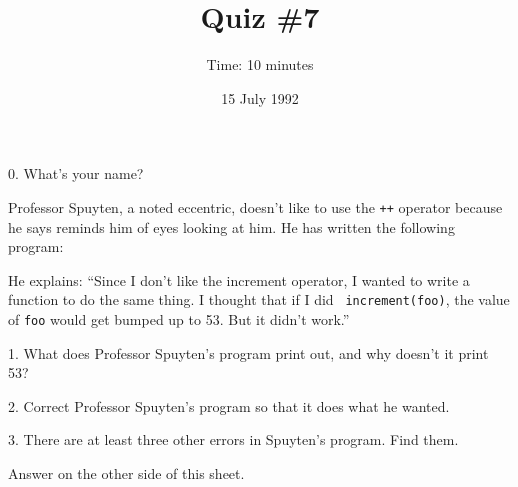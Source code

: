 



\topmargin -0.5in
\textheight 9in

\title{Quiz \#7}
\date{15 July 1992}
\author{Time: 10 minutes}


\maketitle

0. What's your name?

\vspace{.5in}

Professor Spuyten, a noted eccentric, doesn't like to use the {\tt ++}
operator because he says reminds him of eyes looking at him.  He has
written the following program:


\vspace{8pt}

He explains: ``Since I don't like the increment operator, I wanted to
write a function to do the same thing.  I thought that if I did {\tt
increment(foo)}, the value of {\tt foo} would get bumped up to 53.  But
it didn't work.''

\vspace{8pt}
1.  What does Professor Spuyten's program print out, and why doesn't it
print 53?

\vspace{16pt}

2.  Correct Professor Spuyten's program so that it does what he wanted. 

\vspace{16pt}
3.  There are at least three other errors in Spuyten's program.  Find
them.

\vspace{16pt}

Answer on the other side of this sheet.


